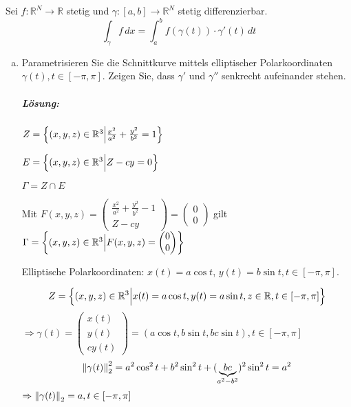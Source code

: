 \documentclass{scrreprt}
\begin{document}
  Sei $f \colon \mathbb{R}^N \to \mathbb{R}$ stetig und
  $\gamma \colon [a, b] \to \mathbb{R}^N$ stetig differenzierbar.
  \[
    \int_{\gamma} f\,dx = \int_a^b f(\gamma(t)) \cdot \gamma'(t)\,dt
  \]
\begin{enumerate}[a)]
\item Parametrisieren Sie die Schnittkurve mittels elliptischer Polarkoordinaten
  $\gamma(t), t \in [-\pi, \pi]$.
  Zeigen Sie, dass $\gamma'$ und $\gamma''$ senkrecht aufeinander stehen.

  \subparagraph{Lösung:} $Z = \qty{(x,y,z) \in \mathbb{R}^3 {\Big |}
    \frac{x^2}{a^2} + \frac{y^2}{b^2} = 1}$

  $E = \qty{(x,y,z) \in \mathbb{R}^3 {\Big |} Z - cy = 0}$

  $\Gamma = Z \cap E$

  Mit $F(x, y, z) = \begin{pmatrix}
    \frac{x^2}{a^2} + \frac{y^2}{b^2} - 1 \\
    Z - cy
  \end{pmatrix} = \begin{pmatrix}
    0 \\
    0
  \end{pmatrix}$ gilt $\Gamma = \qty{
    (x, y, z) \in \mathbb{R}^3 {\Big |} F(x, y, z) = \begin{pmatrix}
      0 \\
      0
    \end{pmatrix}
  }$

  Elliptische Polarkoordinaten: $x(t) = a \cos t$,
  $y(t) = b \sin t, t \in [-\pi, \pi]$.
  \begin{center}
  \end{center}
  \[
    Z = \qty{
      (x, y, z) \in \mathbb{R}^3
      {\Big |}
      x(t) = a \cos t,
      y(t) = a \sin t,
      z \in \mathbb{R},
      t \in [-\pi, \pi]
    }
  \]
  $\Rightarrow \gamma(t) = \begin{pmatrix}
    x(t) \\
    y(t) \\
    cy(t)
  \end{pmatrix} = (a \cos t, b \sin t, bc \sin t), t \in [-\pi, \pi]$
  \[
    \norm{\gamma(t)}_2^2 = a^2\cos^2t + b^2\sin^2t +
    (\underset{a^2-b^2}{\underbrace{bc}})^2 \sin^2t = a^2
  \]
  $\Rightarrow \norm{\gamma(t)}_2 = a, t \in [-\pi, \pi]$


\end{enumerate}
\end{document}
